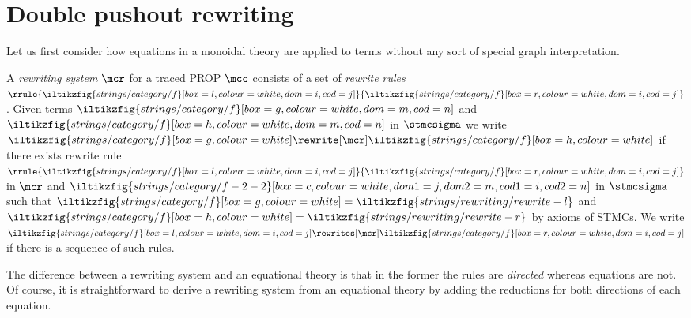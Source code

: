 \section{Double pushout rewriting}

Let us first consider how equations in a monoidal theory are
applied to terms without any sort of special graph interpretation.

\begin{definition}\label{def:term-rewriting}
    A \emph{rewriting system} \(\mcr\) for a traced PROP \(\mcc\)
    consists of a set of \emph{rewrite rules} \(
    \rrule{
        \iltikzfig{strings/category/f}[box=l,colour=white,dom=i,cod=j]
    }{
        \iltikzfig{strings/category/f}[box=r,colour=white,dom=i,cod=j]
    }
    \).
    Given terms \(
    \iltikzfig{strings/category/f}[box=g,colour=white,dom=m,cod=n]
    \) and \(
    \iltikzfig{strings/category/f}[box=h,colour=white,dom=m,cod=n]
    \) in \(\stmcsigma\) we write \(
    \iltikzfig{strings/category/f}[box=g,colour=white]
    \rewrite[\mcr]
    \iltikzfig{strings/category/f}[box=h,colour=white]
    \) if there exists rewrite rule \(\rrule{
        \iltikzfig{strings/category/f}[box=l,colour=white,dom=i,cod=j]
    }{
        \iltikzfig{strings/category/f}[box=r,colour=white,dom=i,cod=j]
    }\) in \(\mcr\) and \(
    \iltikzfig{strings/category/f-2-2}[box=c,colour=white,dom1=j,dom2=m,cod1=i,cod2=n]
    \) in \(\stmcsigma\) such that \(
    \iltikzfig{strings/category/f}[box=g,colour=white]
    =
    \iltikzfig{strings/rewriting/rewrite-l}
    \) and \(
    \iltikzfig{strings/category/f}[box=h,colour=white]
    =
    \iltikzfig{strings/rewriting/rewrite-r}
    \) by axioms of STMCs.
    We write \(
    \iltikzfig{strings/category/f}[box=l,colour=white,dom=i,cod=j]
    \rewrites[\mcr]
    \iltikzfig{strings/category/f}[box=r,colour=white,dom=i,cod=j]
    \) if there is a sequence of such rules.
\end{definition}

The difference between a rewriting system and an equational theory is that in
the former the rules are \emph{directed} whereas equations are not.
Of course, it is straightforward to derive a rewriting system from an equational
theory by adding the reductions for both directions of each equation.

